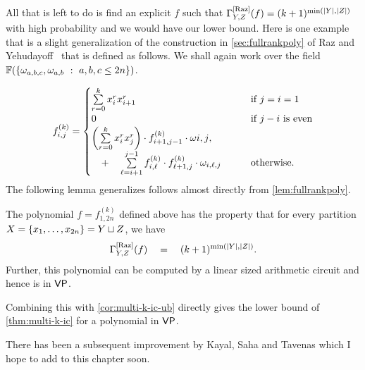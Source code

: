All that is left to do is find an explicit $f$ such that $\Gamma^{\mathrm{[Raz]}}_{Y,Z}(f) = (k+1)^{\min(|Y|,|Z|)}$ with high probability and we would have our lower bound.
Here is one example that is a slight generalization of the construction in \autoref{sec:fullrankpoly}  of Raz and Yehudayoff~\cite{ry08} that is defined as follows.
We shall again work over the field $\mathbb{F}(\left\{{\omega_{a,b,c},\omega_{a,b}}\ : \ {a,b,c\leq 2n}\right\})$.

\[
f_{i,j}^{(k)} =  \begin{cases}
 \sum\limits_{r=0}^k x_i^r x_{i+1}^r & \text{if $j = i=1$}\\
 0  & \text{if $j -i$ is even}\\
 \left(\sum\limits_{r=0}^k x_i^r x_{j}^r\right) \cdot f_{i+1,j-1}^{(k)} \cdot \omega{i,j},& \\
 \quad + \quad \sum\limits_{\ell=i+1}^{j-1} f_{i,\ell}^{(k)} \cdot f_{\ell+1,j}^{(k)} \cdot \omega_{i,\ell,j}\quad\quad & \text{otherwise.}
\end{cases}
\]
\noindent
The following lemma generalizes follows almost directly from \autoref{lem:fullrankpoly}.

\begin{lemma}
The polynomial $f = f_{1,2n}^{(k)}$ defined above has the property that for every partition $X = \left\{x_1,\dots, x_{2n}\right\} = Y \sqcup Z$, we have
\[
\Gamma^{\mathrm{[Raz]}}_{Y,Z}(f) \quad = \quad (k+1)^{\min(|Y|,|Z|)}.
\]
Further, this polynomial can be computed by a linear sized arithmetic circuit and hence is in $\mathsf{VP}$.
\end{lemma}

Combining this with \autoref{cor:multi-k-ic-ub} directly gives the lower bound of \autoref{thm:multi-k-ic} for a polynomial in $\mathsf{VP}$.

\begin{remark}
  There has been a subsequent improvement by Kayal, Saha and Tavenas which I hope to add to this chapter soon.
\end{remark}


